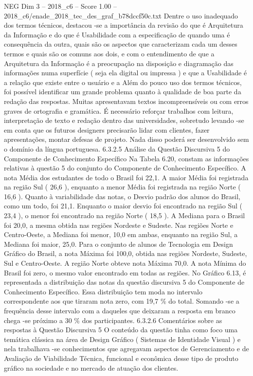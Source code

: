 \begin{textsample}{NEG Dim 3 – 2018\_c6 – Score 1.00 – 2018\_c6/enade\_2018\_tec\_des\_graf\_b78dccf50c.txt}
Dentre o uso inadequado dos termos técnicos, destacou -se a importância da revisão do que é Arquitetura da Informação e do que é Usabilidade com a especificação de quando uma é consequência da outra, quais são os aspectos que caracterizam cada um desses termos e quais são os comuns aos dois, e com o entendimento de que a Arquitetura da Informação é a preocupação na disposição e diagramação das informações numa superfície ( seja ela digital ou impressa ) e que a Usabilidade é a relação que existe entre o usuário e a Além do pouco uso dos termos técnicos, foi possível identificar um grande problema quanto à qualidade de boa parte da redação das respostas.
Muitas apresentavam textos incompreensíveis ou com erros graves de ortografia e gramática.
É necessário reforçar trabalhos com leitura, interpretação de texto e redação dentro das universidades, sobretudo levando -se em conta que os futuros designers precisarão lidar com clientes, fazer apresentações, montar defesas de projeto.
Nada disso poderá ser desenvolvido sem o domínio da língua portuguesa. 6.3.2.5 Análise da Questão Discursiva 5 do Componente de Conhecimento Específico Na Tabela 6.20, constam as informações relativas à questão 5 do conjunto do Componente de Conhecimento Específico.
A nota Média dos estudantes de todo o Brasil foi 22,1.
A maior Média foi registrada na região Sul ( 26,6 ), enquanto a menor Média foi registrada na região Norte ( 16,6 ).
Quanto à variabilidade das notas, o Desvio padrão dos alunos do Brasil, como um todo, foi 21,1.
Enquanto o maior desvio foi encontrado na região Sul ( 23,4 ), o menor foi encontrado na região Norte ( 18,5 ).
A Mediana para o Brasil foi 20,0, a mesma obtida nas regiões Nordeste e Sudeste.
Nas regiões Norte e Centro-Oeste, a Mediana foi menor, 10,0 em ambas, enquanto na região Sul, a Mediana foi maior, 25,0.
Para o conjunto de alunos de Tecnologia em Design Gráfico do Brasil, a nota Máxima foi 100,0, obtida nas regiões Nordeste, Sudeste, Sul e Centro-Oeste.
A região Norte obteve nota Máxima 70,0.
A nota Mínima do Brasil foi zero, o mesmo valor encontrado em todas as regiões.
No Gráfico 6.13, é representada a distribuição das notas da questão discursiva 5 do Componente de Conhecimento Específico.
Essa distribuição tem moda no intervalo correspondente aos que tiraram nota zero, com 19,7 \% do total.
Somando -se a frequência desse intervalo com a daqueles que deixaram a resposta em branco chega -se próximo a 30 \% dos participantes. 6.3.2.6 Comentários sobre as respostas à Questão Discursiva 5 O conteúdo da questão tinha como foco uma temática clássica na área de Design Gráfico ( Sistemas de Identidade Visual ) e nela trabalhava -se conhecimentos que agregavam aspectos de Gerenciamento e de Avaliação de Viabilidade Técnica, funcional e econômica desse tipo de produto gráfico na sociedade e no mercado de atuação dos clientes.

\end{textsample}
